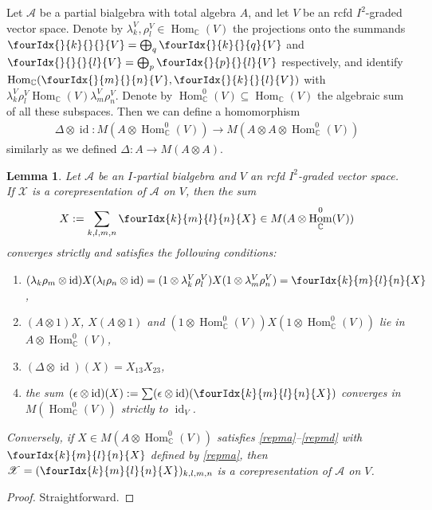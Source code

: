 \documentclass[10pt]{article}
\DeclareMathOperator{\id}{id}
\DeclareMathOperator{\Hom}{Hom}
\newcommand{\C}{\mathbb{C}}
\newcommand{\Gr}[5]{\fourIdx{#2}{#4}{#3}{#5}{#1}}%
\newcommand{\Gru}[3]{\Gr{#1}{}{}{#2}{#3}}
\newtheorem{Lem}[Theorem]{Lemma}
\theoremstyle{definition}
\numberwithin{equation}{section}
\begin{document}
Let $\mathscr{A}$ be a partial bialgebra with total algebra $A$, and
let $V$ be an rcfd $I^{2}$-graded vector space.
Denote by $\lambda^{V}_{k},\rho^{V}_{l} \in \Hom_{\C}(V)$ the
projections onto the summands $\Gru{V}{k}{} = \bigoplus_{q}
\Gru{V}{k}{q}$ and $\Gru{V}{}{l}=\bigoplus_{p}\Gru{V}{p}{l}$
respectively, and identify $\Hom_{\C}(\Gru{V}{m}{n},\Gru{V}{k}{l})$ with
$\lambda^{V}_{k}\rho^{V}_{l}\Hom_{\C}(V)\lambda^{V}_{m}\rho^{V}_{n}$. Denote by $\Hom_{\C}^{0}(V) \subseteq \Hom_{\C}(V)$ the algebraic sum of all
these subspaces. Then we can define a homomorphism
\begin{align*}
  \Delta \otimes \id \colon M(A \otimes \Hom_{\C}^{0}(V)) \to M(A
  \otimes A \otimes \Hom_{\C}^{0}(V))
\end{align*}
similarly as we defined $ \Delta \colon A \to M(A\otimes A)$.
\begin{Lem} \label{lemma:rep-multiplier}
  Let  $\mathscr{A}$ be an $I$-partial bialgebra and $V$  an rcfd $I^{2}$-graded vector space.  If $\mathscr{X}$ is a
  corepresentation of  $\mathscr{A}$ on $V$, then the sum
  \begin{align}
    \label{eq:rep-multiplier}
  X:=\sum_{k,l,m,n} \Gr{X}{k}{l}{m}{n} \in  M(A
  \otimes \Hom_{\C}^{0}(V))
  \end{align}
 converges strictly and satisfies the following conditions:
  \begin{enumerate}[label=(\arabic*)] 
  \item\label{repma} $(\lambda_{k}\rho_{m} \otimes \id){X}(\lambda_{l}\rho_{n}
    \otimes \id) = (1 \otimes \lambda^{V}_{k}\rho^{V}_{l}){X}(1 \otimes
    \lambda^{V}_{m}\rho^{V}_{n}) = \Gr{X}{k}{l}{m}{n}$,
  \item\label{repmb} $(A \otimes 1){X}$, $ {X}(A \otimes 1)$ and $(1 \otimes
    \Hom^{0}_{\C}(V))X(1 \otimes \Hom^{0}_{\C}(V))$ lie in $A \otimes \Hom_{\C}^{0}(V)$,
  \item\label{repmc} $(\Delta\otimes \id)(X)=X_{13}X_{23}$, 
  \item\label{repmd} the sum $(\epsilon \otimes \id)({X}) :=\sum (\epsilon \otimes
    \id)(\Gr{X}{k}{l}{m}{n})$ converges in $M(\Hom^{0}_{\C}(V))$ strictly
    to $\id_{V}$.
  \end{enumerate}
  Conversely, if $ X \in M(A \otimes \Hom_{\C}^{0}(V))$ satisfies
  \ref{repma}--\ref{repmd} with $\Gr{X}{k}{l}{m}{n}$ defined by \ref{repma}, then
  $\mathscr{X}=(\Gr{X}{k}{l}{m}{n})_{k,l,m,n}$ is a corepresentation
  of $\mathscr{A}$ on $V$.
\end{Lem}
\begin{proof}
 Straightforward.
\end{proof}
\end{document}
